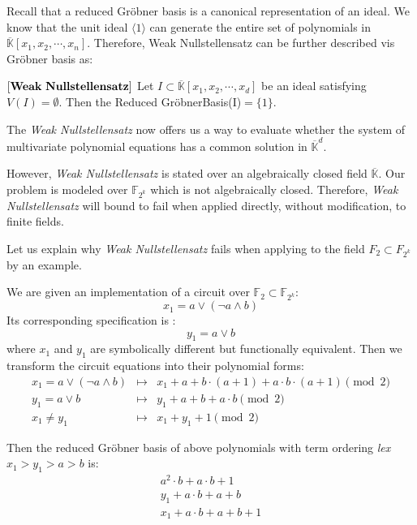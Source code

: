 Recall that a reduced Gr\"obner basis is a canonical representation of
an ideal.  We know that the unit ideal $\langle 1 \rangle$ can 
generate the entire set of polynomials in $\overline{\mathbb{K}}[x_1,
x_2, \cdots, x_n]$.  Therefore, Weak Nullstellensatz can be further
described vis Gr\"obner basis as:

\begin{Corollary}\label{cor:wnf2}
$\left[\bf{Weak\  Nullstellensatz}\right]$ Let $I \subset \overline
{\mathbb{K}}[x_1, x_2, \cdots, x_d]$ be an ideal satisfying
$V(I)=\emptyset$.  Then the Reduced Gr\"obnerBasis(I)$=\{1\}$.
\end{Corollary}

The {\it Weak Nullstellensatz} now offers us a way to evaluate whether
the system of multivariate polynomial equations has a common solution
in ${\overline {\mathbb{K}}}^d$. 

However, {\it Weak Nullstellensatz} is stated over an algebraically
closed field $\overline{\mathbb{K}}$.
Our problem is modeled over $\mathbb{F}_{2^{k}}$ which is not 
algebraically closed. Therefore, {\it Weak Nullstellensatz} will bound
to fail when applied directly, without modification, to finite fields. 

Let us explain why {\it Weak Nullstellensatz} fails when applying to
the field $F_{2}\subset F_{2^{k}}$ by an example. 
\begin{Example} \label{exp:wnfail}
We are given an implementation of a circuit over $\mathbb{F}_2 \subset \mathbb{F}_{2^{k}}$: 
\begin{equation}
x_1=a \vee (\neg a \wedge b)
\end{equation}
Its corresponding specification is :
\begin{equation}
y_1=a \vee b
\end{equation}
where $x_1$ and $y_1$ are symbolically different but functionally equivalent.  
Then we transform the circuit equations into their polynomial forms:
\begin{eqnarray}
x_1=a \vee (\neg a \wedge b) &\mapsto& x_1 + a + b\cdot (a+1) + a\cdot b \cdot (a+1) \pmod 2 \nonumber \\
y_1=a \vee b  &\mapsto& y_{1}+a+b+a\cdot b \pmod 2 \nonumber \\
x_1 \neq y_{1}  &\mapsto& x_1+y_1+1 \pmod 2 \nonumber
\end{eqnarray}
\end{Example}
Then the reduced Gr\"obner basis of above polynomials with term
ordering {\it lex} $x_{1}>y_{1}>a>b$ is:  
\begin{eqnarray}
a^{2}\cdot b+a \cdot b+1 \nonumber \\
y_{1}+a \cdot b+a+b \nonumber \\
x_{1}+a \cdot b+a+b+1 \nonumber 
\end{eqnarray}

